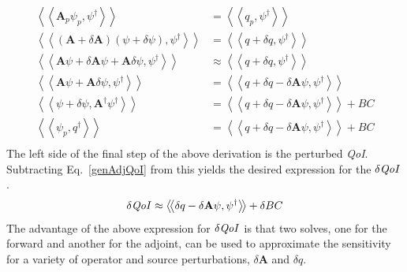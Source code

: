 \documentclass[12pt]{report}
\newcommand{\braSN}{\left\langle \! \left\langle}
\newcommand{\ketSN}{\right\rangle \! \right\rangle}
\newcommand{\qoi}{{\it QoI}\xspace}
\begin{document}
\begin{equation}
\begin{split}
\braSN \mathbf{A}_p \psi_p ,\psi^\dag\ketSN &= \braSN q_p ,\psi^\dag \ketSN \\
\braSN \left( \mathbf{A}+\delta \mathbf{A} \right) \left( \psi + \delta \psi \right),\psi^\dag\ketSN &= \braSN q+\delta q ,\psi^\dag \ketSN \\
\braSN \mathbf{A} \psi +\delta \mathbf{A} \psi + \mathbf{A} \delta \psi ,\psi^\dag\ketSN &\approx \braSN q+\delta q ,\psi^\dag \ketSN \\
\braSN \mathbf{A} \psi + \mathbf{A} \delta \psi ,\psi^\dag\ketSN &= \braSN q+\delta q - \delta \mathbf{A} \psi  ,\psi^\dag \ketSN \\
\braSN \psi +\delta \psi , \mathbf{A^\dag} \psi^\dag\ketSN &= \braSN q+\delta q - \delta \mathbf{A} \psi  ,\psi^\dag \ketSN + BC \\
\braSN \psi_p , q^\dag \ketSN &= \braSN q+\delta q - \delta \mathbf{A} \psi  ,\psi^\dag \ketSN + BC \\
\end{split}
\end{equation}
The left side of the final step of the above derivation is the perturbed \qoi. Subtracting Eq.~\eqref{genAdjQoI} from this yields the desired expression for the $\delta\qoi$.
\begin{equation}
\label{genAdjSens}
\delta \qoi \approx \braSN \delta q - \delta \mathbf{A} \psi , \psi^\dag \ketSN + \delta BC
\end{equation}
The advantage of the above expression for $\delta\qoi$ is that two solves, one for the forward and another for the adjoint, can be used to approximate the sensitivity for a variety of operator and source perturbations, $\delta \mathbf{A}$ and $\delta q$.

\end{document}
